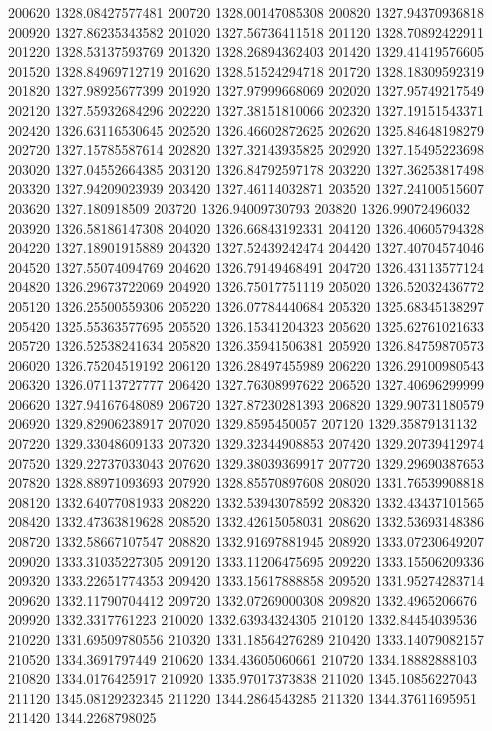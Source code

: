 {200620 1328.08427577481
200720 1328.00147085308
200820 1327.94370936818
200920 1327.86235343582
201020 1327.56736411518
201120 1328.70892422911
201220 1328.53137593769
201320 1328.26894362403
201420 1329.41419576605
201520 1328.84969712719
201620 1328.51524294718
201720 1328.18309592319
201820 1327.98925677399
201920 1327.97999668069
202020 1327.95749217549
202120 1327.55932684296
202220 1327.38151810066
202320 1327.19151543371
202420 1326.63116530645
202520 1326.46602872625
202620 1325.84648198279
202720 1327.15785587614
202820 1327.32143935825
202920 1327.15495223698
203020 1327.04552664385
203120 1326.84792597178
203220 1327.36253817498
203320 1327.94209023939
203420 1327.46114032871
203520 1327.24100515607
203620 1327.180918509
203720 1326.94009730793
203820 1326.99072496032
203920 1326.58186147308
204020 1326.66843192331
204120 1326.40605794328
204220 1327.18901915889
204320 1327.52439242474
204420 1327.40704574046
204520 1327.55074094769
204620 1326.79149468491
204720 1326.43113577124
204820 1326.29673722069
204920 1326.75017751119
205020 1326.52032436772
205120 1326.25500559306
205220 1326.07784440684
205320 1325.68345138297
205420 1325.55363577695
205520 1326.15341204323
205620 1325.62761021633
205720 1326.52538241634
205820 1326.35941506381
205920 1326.84759870573
206020 1326.75204519192
206120 1326.28497455989
206220 1326.29100980543
206320 1326.07113727777
206420 1327.76308997622
206520 1327.40696299999
206620 1327.94167648089
206720 1327.87230281393
206820 1329.90731180579
206920 1329.82906238917
207020 1329.8595450057
207120 1329.35879131132
207220 1329.33048609133
207320 1329.32344908853
207420 1329.20739412974
207520 1329.22737033043
207620 1329.38039369917
207720 1329.29690387653
207820 1328.88971093693
207920 1328.85570897608
208020 1331.76539908818
208120 1332.64077081933
208220 1332.53943078592
208320 1332.43437101565
208420 1332.47363819628
208520 1332.42615058031
208620 1332.53693148386
208720 1332.58667107547
208820 1332.91697881945
208920 1333.07230649207
209020 1333.31035227305
209120 1333.11206475695
209220 1333.15506209336
209320 1333.22651774353
209420 1333.15617888858
209520 1331.95274283714
209620 1332.11790704412
209720 1332.07269000308
209820 1332.4965206676
209920 1332.3317761223
210020 1332.63934324305
210120 1332.84454039536
210220 1331.69509780556
210320 1331.18564276289
210420 1333.14079082157
210520 1334.3691797449
210620 1334.43605060661
210720 1334.18882888103
210820 1334.0176425917
210920 1335.97017373838
211020 1345.10856227043
211120 1345.08129232345
211220 1344.2864543285
211320 1344.37611695951
211420 1344.2268798025
}
